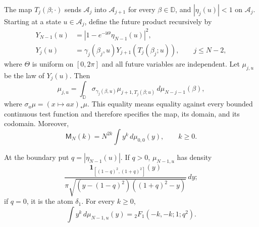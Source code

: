 \begin{theorem}
\label{thm:cueM-measure-peel}
The map $T_j(\beta;\cdot)$ sends $\mathcal A_j$ into $\mathcal A_{j+1}$ for every
$\beta\in\mathbb D$, and $|\eta_j(u)|<1$ on $\mathcal A_j$.  Starting at a state
$u\in\mathcal A_j$, define the future product recursively by
\begin{align}
 Y_{N-1}(u)&=|1-e^{-\mathrm i\Theta}\eta_{N-1}(u)|^2,
 \label{eq:cueM-terminal-Y}\\
 Y_j(u)&=\gamma_j(\beta_j,u)
 Y_{j+1}(T_j(\beta_j;u)),
 \qquad j\leq N-2,
 \label{eq:cueM-recursive-Y}
\end{align}
where $\Theta$ is uniform on $[0,2\pi]$ and all future variables are independent.  Let
$\mu_{j,u}$ be the law of $Y_j(u)$.  Then
\begin{equation}
 \mu_{j,u}=
 \int_{\mathbb D}\sigma_{\gamma_j(\beta,u)}
 \mu_{j+1,T_j(\beta;u)}\,d\mu_{N-j-1}(\beta),
 \label{eq:cueM-measure-recursion}
\end{equation}
where $\sigma_a\mu=(x\mapsto ax)_*\mu$.  This equality means equality against every bounded
continuous test function and therefore specifies the map, its domain, and its codomain.
Moreover,
\begin{equation}
 \mathsf M_N(k)=N^{2k}\int y^k\,d\mu_{0,0}(y),
 \qquad k\geq0.
 \label{eq:cueM-peel-moment}
\end{equation}

At the boundary put $q=|\eta_{N-1}(u)|$.  If $q>0$, $\mu_{N-1,u}$ has density
\begin{equation}
 \frac{
 \mathbf1_{[(1-q)^2,(1+q)^2]}(y)
 }{\pi\sqrt{(y-(1-q)^2)((1+q)^2-y)}}\,dy;
 \label{eq:cueM-boundary-arcsine}
\end{equation}
if $q=0$, it is the atom $\delta_1$.  For every $k\geq0$,
\begin{equation}
 \int y^k\,d\mu_{N-1,u}(y)
 ={}_2F_1(-k,-k;1;q^2).
 \label{eq:cueM-boundary-hypergeometric}
\end{equation}
\end{theorem}

